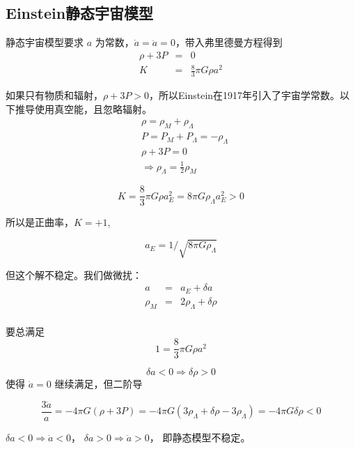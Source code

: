 \documentclass[12pt]{ctexart}
\begin{document}
\subsection{Einstein静态宇宙模型}

静态宇宙模型要求 $a$ 为常数，$\dot{a}=\ddot{a}=0$，带入弗里德曼方程得到
\begin{eqnarray}
    \rho+3P&=&0 \\
    K &=& \frac{8}{3} \pi G \rho a^2
\end{eqnarray}

如果只有物质和辐射，$\rho+3P>0$，所以Einstein在1917年引入了宇宙学常数。以下推导使用真空能，且忽略辐射。
\begin{equation}
    \begin{aligned}
    &\rho=\rho_{M}+\rho_{\Lambda}\\
    &P=P_{M}+P_{\Lambda}=-\rho_{\Lambda}\\
    &\rho+3 P = 0 \\
    & \Rightarrow \rho_{\Lambda}=\frac{1}{2} \rho_{M}
    \end{aligned}
\end{equation}

\begin{equation}
    K=\frac{8}{3} \pi G \rho a_{E}^{2}=8\pi G \rho_\Lambda a_{E}^{2}>0
\end{equation}

所以是正曲率，$K=+1$,

\begin{equation}
    a_E = 1/\sqrt{8\pi G \rho_\Lambda}
\end{equation}

但这个解不稳定。我们做微扰：
\begin{eqnarray}
    a&=&a_{E}+\delta a \\ 
    \rho_{M}&=&2 \rho_\Lambda+\delta \rho \\ 
\end{eqnarray}

要总满足
\begin{equation}
    1=\frac{8}{3} \pi G \rho a^{2}
\end{equation}

\begin{equation}
    \delta a<0 \Rightarrow \delta \rho>0 
\end{equation}
使得 $\dot{a}=0$ 继续满足，但二阶导

\begin{equation}
    \frac{3 \ddot{a}}{a}=-4 \pi G(\rho+3 P)=-4 \pi G\left(3 \rho_\Lambda+\delta \rho-3 \rho_\Lambda\right)=-4 \pi G \delta \rho<0
\end{equation}

$\delta a<0  \Rightarrow \ddot{a}<0$，
$\delta a>0  \Rightarrow \ddot{a}>0$，
即静态模型不稳定。
\end{document}
